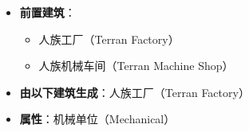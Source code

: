 \begin{tcolorbox}[colback=white, colframe=black!60!white, title=Terran\_Siege\_Tank\_Tank\_Mode(), arc=0mm]
\begin{itemize}
\begin{itemize}
            \end{itemize}
        \item \textbf{前置建筑}：
            \begin{itemize}
                \item 人族工厂（Terran Factory）
                \item 人族机械车间（Terran Machine Shop）
            \end{itemize}
        \item \textbf{由以下建筑生成}：人族工厂（Terran Factory）
        \item \textbf{属性}：机械单位（Mechanical）
    \end{itemize}
\end{tcolorbox}